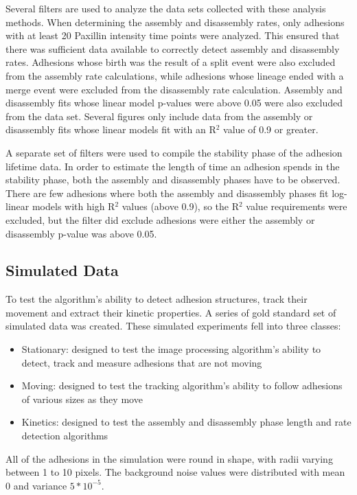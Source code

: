 \documentclass[10pt]{article}
\begin{document}
Several filters are used to analyze the data sets collected with these analysis
methods. When determining the assembly and disassembly rates, only adhesions
with at least 20 Paxillin intensity time points were analyzed. This ensured that
there was sufficient data available to correctly detect assembly and disassembly
rates. Adhesions whose birth was the result of a split event were also excluded
from the assembly rate calculations, while adhesions whose lineage ended with a
merge event were excluded from the disassembly rate calculation. Assembly and
disassembly fits whose linear model p-values were above 0.05 were also excluded
from the data set. Several figures only include data from the assembly or
disassembly fits whose linear models fit with an R$^2$ value of 0.9 or greater.

A separate set of filters were used to compile the stability phase of the
adhesion lifetime data. In order to estimate the length of time an adhesion
spends in the stability phase, both the assembly and disassembly phases have to
be observed. There are few adhesions where both the assembly and disassembly
phases fit log-linear models with high R$^2$ values (above 0.9), so the
R$^2$ value requirements were excluded, but the filter did exclude adhesions
were either the assembly or disassembly p-value was above 0.05.

\subsection*{Simulated Data}

To test the algorithm's ability to detect adhesion structures, track their
movement and extract their kinetic properties. A series of gold standard set of
simulated data was created. These simulated experiments fell into three classes:

\begin{itemize}
	\item Stationary: designed to test the image processing algorithm's ability
	to detect, track and measure adhesions that are not moving
	\item Moving: designed to test the tracking algorithm's ability to follow
	adhesions of various sizes as they move
	\item Kinetics: designed to test the assembly and disassembly phase length
	and rate detection algorithms
\end{itemize}

All of the adhesions in the simulation were round in shape, with radii varying
between 1 to 10 pixels. The background noise values were distributed with mean 0
and variance $5*10^{-5}$.
\end{document}
